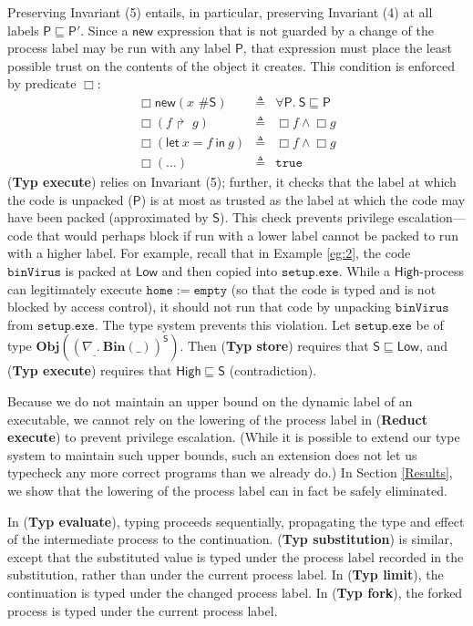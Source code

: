 \documentclass{sigplanconf}
\newcommand{\labp}{\mathsf P}
\newcommand{\labb}{\mathsf S}
\newcommand{\fork}[2]{#1\Rsh\:\!#2}
\newcommand{\eval}[3]{\mathsf{let}~#1=#2~\mathsf{in}~#3}
\newcommand{\trule}[1]{(\textbf{Typ #1})}
\newcommand{\rrule}[1]{\textbf{Reduct #1}}
\begin{document}
Preserving Invariant (5) entails, in particular, preserving Invariant (4) at all labels $\labp \sqsubseteq \labp'$. Since a $\mathsf{new}$ expression that is not guarded by a change of the process label may be run with any label $\labp$, that expression must place the least possible trust on the contents of the object it creates. This condition is enforced  by predicate  $\Box$:
\begin{eqnarray*}
\Box \mathsf{new}(x\mbox{ \# }\labb) & \triangleq & \forall \labp.~\labb \sqsubseteq \labp \\ \Box(\fork f g) &\triangleq & \Box f  \wedge \Box g \\ \Box(\eval x f g)  &\triangleq &  \Box f  \wedge \Box g \\ \Box(\dots) &\triangleq &  \mathtt{true} \end{eqnarray*}
\trule{execute} relies on Invariant (5); further, it checks that the label at which the code is unpacked ($\labp$) is at most as trusted as the label at which the code may have been packed (approximated by $\labb$). This check prevents privilege escalation---code that would perhaps block if run with a lower label cannot be packed to run with a higher label. For example, recall that in Example \ref{eg:2}, the code $\mathtt{binVirus}$
is packed at $\mathsf{Low}$ and then copied into $\mathtt{setup.exe}$. While a $\mathsf{High}$-process can legitimately execute $\mathtt{home} := \mathtt{empty}$ (so that the code is typed and is not blocked by access control), it should not run that code by unpacking $\mathtt{binVirus}$ from $\mathtt{setup.exe}$. The type system prevents this violation. Let $\mathtt{setup.exe}$ be of type $\mathbf{Obj}((\nabla_{\_}.~\mathbf{Bin}(\_))^{\labb})$. Then \trule{store} requires that $\labb \sqsubseteq \mathsf{Low}$, and \trule{execute} requires that $\mathsf{High} \sqsubseteq \labb$ (contradiction). 

Because we do not maintain an upper bound on the dynamic label of an executable, we cannot rely on the lowering of the process label in (\rrule{execute}) to prevent privilege escalation. (While it is possible to extend our type system to maintain such upper bounds, such an extension does not let us typecheck any more correct programs than we already do.) In Section \ref{Results}, we show that the lowering of the process label can in fact be safely
eliminated. 


In \trule{evaluate}, typing proceeds sequentially, propagating the type and effect of the intermediate process to the continuation.
\trule{substitution} is similar, except that the substituted value is typed under the process label recorded in the
substitution, rather than under the current process label. In \trule{limit}, the continuation is typed under the
changed process label. In \trule{fork}, the forked process is typed under the current process label.
\end{document}
